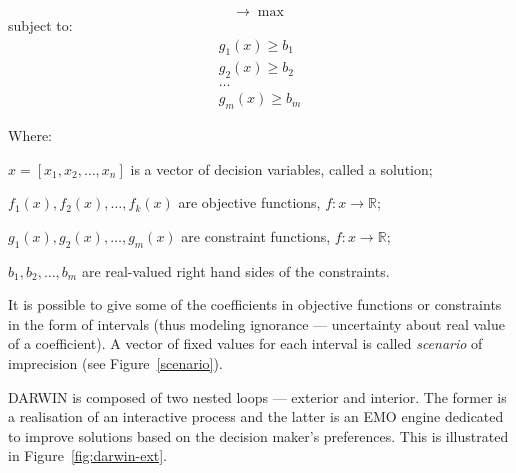 \begin{equation}
[ f_1(x), f_2(x), \dots, f_k(x) ] \rightarrow  \max
\end{equation}
subject to:
\begin{equation}
\begin{array}{l}
g_1(x) \geq b_1 \\
g_2(x) \geq b_2 \\
\dots \\
g_m(x) \geq b_m
\end{array}
\end{equation}

Where:
\begin{description}
\item $x = [x_1, x_2, \dots, x_n]$ is a vector of decision variables, called a
  solution;
\item $f_1(x), f_2(x), \dots, f_k(x)$ are objective functions,
  $f: x \rightarrow \mathbb{R}$;
\item $g_1(x), g_2(x), \dots, g_m(x)$ are constraint functions,
  $f: x \rightarrow \mathbb{R}$;
\item $b_1, b_2, \dots, b_m$ are real-valued right hand sides of the
  constraints.
\end{description}

It is possible to give some of the coefficients in objective functions or
constraints in the form of intervals (thus modeling ignorance --- uncertainty
about real value of a coefficient). A vector of fixed values for each interval
is called \textit{scenario} of imprecision (see Figure~\ref{scenario}).

DARWIN is composed of two nested loops --- exterior and interior. The former
is a realisation of an interactive process and the latter is an EMO engine
dedicated to improve solutions based on the decision maker's preferences. This
is illustrated in Figure~\ref{fig:darwin-ext}.

